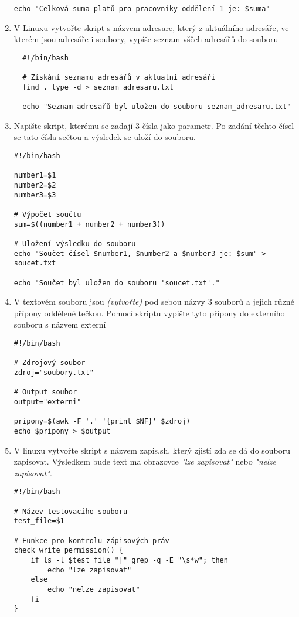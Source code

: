 \documentclass{article}
\begin{document}
\begin{enumerate}
\begin{lstlisting}[caption=skript secti.sh]
echo "Celková suma platů pro pracovníky oddělení 1 je: $suma"
\end{lstlisting}
\item V Linuxu vytvořte skript s názvem adresare, který z aktuálního adresáře, ve kterém jsou adresáře i soubory, vypíše seznam všěch adresářů do souboru
\begin{lstlisting}
  #!/bin/bash

  # Získání seznamu adresářů v aktualní adresáři
  find . type -d > seznam_adresaru.txt

  echo "Seznam adresařů byl uložen do souboru seznam_adresaru.txt"
\end{lstlisting}
\item Napište skript, kterému se zadají 3 čísla jako parametr. Po zadání těchto čísel se tato čísla sečtou a výsledek se uloží do souboru.
\begin{lstlisting}
#!/bin/bash

number1=$1
number2=$2
number3=$3

# Výpočet součtu
sum=$((number1 + number2 + number3))

# Uložení výsledku do souboru
echo "Součet čísel $number1, $number2 a $number3 je: $sum" > soucet.txt

echo "Součet byl uložen do souboru 'soucet.txt'."
\end{lstlisting}

\item V textovém souboru jsou \textit{(vytvořte)} pod sebou názvy 3 souborů a jejich různé přípony oddělené tečkou. Pomocí skriptu vypište tyto přípony do externího souboru s názvem externí
\begin{lstlisting}
#!/bin/bash

# Zdrojový soubor
zdroj="soubory.txt"

# Output soubor
output="externi"

pripony=$(awk -F '.' '{print $NF}' $zdroj)
echo $pripony > $output
\end{lstlisting}
  \item V linuxu vytvořte skript s názvem zapis.sh, který zjistí zda se dá do souboru zapisovat. Výsledkem bude text ma obrazovce \textit{"lze zapisovat"} nebo \textit{"nelze zapisovat"}.
    \begin{lstlisting}[caption=zapis.sh musel jsem modifikovat pipe aby se zobrazil ale normálně je to jen ta vertikalní čárka]
#!/bin/bash

# Název testovacího souboru
test_file=$1

# Funkce pro kontrolu zápisových práv
check_write_permission() {
    if ls -l $test_file "|" grep -q -E "\s*w"; then
        echo "lze zapisovat"
    else
        echo "nelze zapisovat"
    fi
}


\end{lstlisting}
\end{enumerate}
\end{document}

